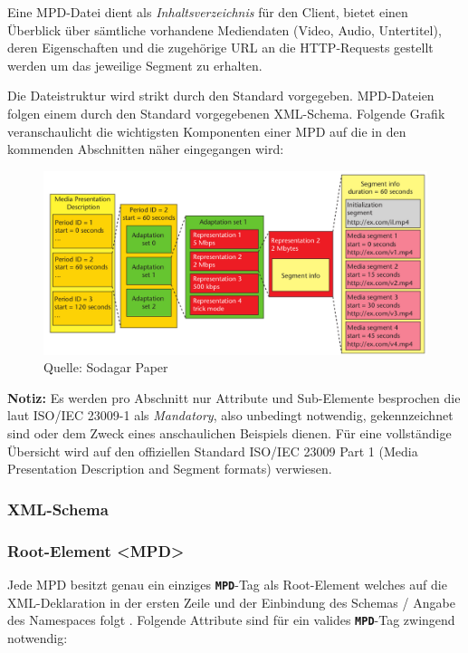 \documentclass[paper = a4, fontsize = 12pt, parskip = half]{scrartcl} %
\def\elem#1{\texttt{\textbf{#1}}}
\begin{document}
Eine MPD-Datei dient als \textit{Inhaltsverzeichnis} für den Client, bietet einen Überblick über sämtliche vorhandene Mediendaten (Video, Audio, Untertitel), deren Eigenschaften und die zugehörige URL an die HTTP-Requests gestellt werden um das jeweilige Segment zu erhalten. \cite{international_organization_for_standardization_isoiec_nodate}

Die Dateistruktur wird strikt durch den Standard vorgegeben. MPD-Dateien folgen einem durch den Standard vorgegebenen XML-Schema. Folgende Grafik veranschaulicht die wichtigsten Komponenten einer MPD auf die in den kommenden Abschnitten näher eingegangen wird:

	\begin{figure}[h!]
		\centering
		\includegraphics[width=12cm]{images/mpd-structure.png}
		\caption{Quelle: Sodagar Paper}
	\end{figure}

\textbf{Notiz:} Es werden pro Abschnitt nur Attribute und Sub-Elemente besprochen die laut ISO/IEC 23009-1 als \textit{Mandatory}, also unbedingt notwendig, gekennzeichnet sind oder dem Zweck eines anschaulichen Beispiels dienen. Für eine vollständige Übersicht wird auf den offiziellen Standard ISO/IEC 23009 Part 1 (Media Presentation Description and Segment formats) verwiesen.

\subsubsection{XML-Schema}

\subsubsection{Root-Element <MPD>}
Jede MPD besitzt genau ein einziges \elem{MPD}-Tag als Root-Element welches auf die XML-Deklaration in der ersten Zeile und der Einbindung des Schemas / Angabe des Namespaces folgt \cite{international_organization_for_standardization_isoiec_nodate}.
Folgende Attribute sind für ein valides \elem{MPD}-Tag zwingend notwendig:
\end{document}
